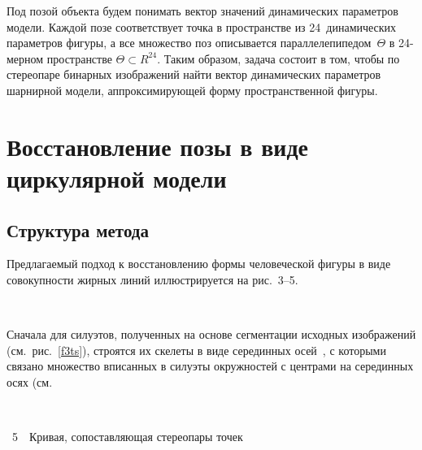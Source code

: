 \begin{multicols}{2}
     Под позой объекта будем понимать вектор значений динамических 
параметров модели. Каждой позе соответствует точка в пространстве из 
24~динамических параметров фигуры, а все множество поз описывается 
параллелепипедом~$\Theta$ в 24-мерном пространстве $\Theta\subset R^{24}$. 
Таким образом, задача состоит в том, чтобы по стереопаре бинарных 
изображений найти вектор динамических па\-ра\-мет\-ров шарнирной модели, 
аппроксимирующей форму пространственной фигуры.

\section{Восстановление позы в виде циркулярной модели }

\subsection{Структура метода} %

     Предлагаемый подход к восстановлению формы человеческой фигуры в 
виде совокупности жирных линий иллюстрируется на рис.~3--5. 
\begin{figure*} %
\vspace*{1pt}
\begin{center}
\mbox{%
\epsfxsize=88.443mm
}
\end{center}
\vspace*{-6pt}
\vspace*{6pt}
\end{figure*}


     Сначала для силуэтов, полученных на основе сегментации исходных 
изображений (см.\ рис.~\ref{f3ts}), строятся их скелеты в виде серединных 
осей~\cite{12ts}, с которыми связано множество вписанных в силуэты 
окружностей с центрами на серединных осях (см.\linebreak\vspace*{-12pt}
\pagebreak

\noindent
\begin{center} %
\vspace*{-6pt}
\mbox{%
\epsfxsize=73.118mm
}
\end{center}
\vspace*{3pt}
{{\figurename~5}\ \ \small{Кривая, сопоставляющая стереопары точек}}
\vspace*{3pt}


\end{multicols}

